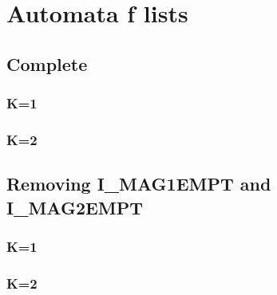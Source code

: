 
\chapter{Automata f lists}
\label{chap:automataFlists}

% 
\twocolumn
\section{Complete}
\subsection{K=1}
\scriptsize


\subsection{K=2}



\section{Removing I\_MAG1EMPT and I\_MAG2EMPT}
\subsection{K=1}
\scriptsize


\subsection{K=2}

\normalsize
\onecolumn
